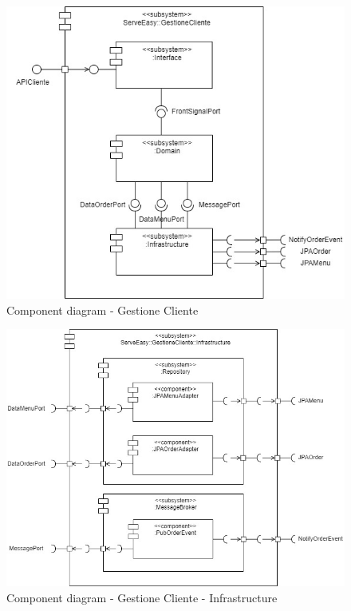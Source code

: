 \begin{figure}[htbp]
	\centering
	\includegraphics[scale=0.5]{iterazione1/images/GestioneCliente_subsystem-GestioneCliente.jpg}
	\caption{Component diagram - Gestione Cliente \label{fig:component_diagram_gestione_cliente}}
\end{figure}

\begin{figure}[htbp]
	\centering
	\includegraphics[scale=0.5]{iterazione1/images/GestioneCliente_subsystem-Infrastructure.jpg}
	\caption{Component diagram - Gestione Cliente - Infrastructure \label{fig:component_diagram_gestione_cliente_infrastructure}}
\end{figure}

